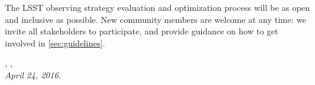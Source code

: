 \noindent The LSST observing strategy evaluation and optimization
process will be as open and inclusive as possible. New community members
are welcome at any time: we invite all stakeholders to participate, and
provide guidance on how to get involved in \autoref{sec:guidelines}.

\vspace{2\baselineskip}

{\raggedleft {}, ,  \\
 \medskip \hspace{0.8\linewidth} \it April 24, 2016.}

\clearpage
